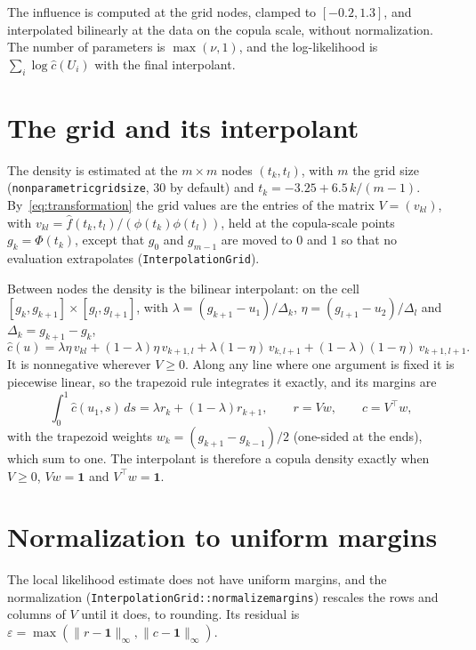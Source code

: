 \documentclass[11pt]{article}
\newcommand{\codeus}{\textunderscore\allowbreak}
\newcommand{\code}[1]{\begingroup\let\_\codeus\texttt{#1}\endgroup}
\newcommand{\one}{\mathbf{1}}
\begin{document}
The influence is computed at the grid nodes, clamped to $[-0.2, 1.3]$, and
interpolated bilinearly at the data on the copula scale, without
normalization. The number of parameters is $\max(\nu, 1)$, and the
log-likelihood is $\sum_i \log \hat c(U_i)$ with the final interpolant.

\section{The grid and its interpolant}
\label{sec:grid}

The density is estimated at the $m \times m$ nodes $(t_k, t_l)$, with $m$ the
grid size (\code{nonparametric\_grid\_size}, $30$ by default) and
$t_k = -3.25 + 6.5\, k / (m - 1)$. By~\eqref{eq:transformation} the grid values
are the entries of the matrix $V = (v_{kl})$, with $v_{kl} = \hat f(t_k, t_l) /
(\phi(t_k)\phi(t_l))$, held at the copula-scale points $g_k = \Phi(t_k)$,
except that $g_0$ and $g_{m-1}$ are moved to $0$ and $1$ so that no evaluation
extrapolates (\code{InterpolationGrid}).

Between nodes the density is the bilinear interpolant: on the cell
$[g_k, g_{k+1}] \times [g_l, g_{l+1}]$, with $\lambda = (g_{k+1} - u_1) /
\Delta_k$, $\eta = (g_{l+1} - u_2) / \Delta_l$ and $\Delta_k = g_{k+1} - g_k$,
\[
  \hat c(u) = \lambda\eta\, v_{kl} + (1 - \lambda)\eta\, v_{k+1,l}
            + \lambda(1 - \eta)\, v_{k,l+1} + (1 - \lambda)(1 - \eta)\,
              v_{k+1,l+1}.
\]
It is nonnegative wherever $V \geq 0$. Along any line where one argument is
fixed it is piecewise linear, so the trapezoid rule integrates it exactly, and
its margins are
\begin{equation}
  \int_0^1 \hat c(u_1, s)\, ds = \lambda r_k + (1 - \lambda) r_{k+1},
  \qquad r = V w, \qquad c = V^\top w,
  \label{eq:margins}
\end{equation}
with the trapezoid weights $w_k = (g_{k+1} - g_{k-1}) / 2$ (one-sided at the
ends), which sum to one. The interpolant is therefore a copula density exactly
when $V \geq 0$, $V w = \one$ and $V^\top w = \one$.

\section{Normalization to uniform margins}
\label{sec:normalization}

The local likelihood estimate does not have uniform margins, and the
normalization (\code{InterpolationGrid::normalize\_margins}) rescales the rows
and columns of $V$ until it does, to rounding. Its residual is
$\varepsilon = \max(\lVert r - \one \rVert_\infty, \lVert c - \one
\rVert_\infty)$.
\end{document}
